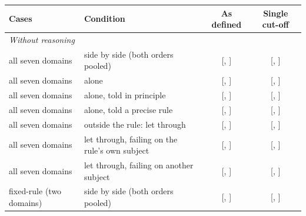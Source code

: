 \begin{table}[t]
\centering
\footnotesize
\begin{tabular}{llcc}
\toprule
Cases & Condition & As defined & Single cut-off \\
\midrule
\multicolumn{4}{l}{\textit{Without reasoning}} \\
all seven domains & side by side (both orders pooled) & \SideBySideNoReasoning{} [\SideBySideNoReasoningLo{}, \SideBySideNoReasoningHi{}] & \CutoffHalfSideBySideNoReasoning{} [\CutoffHalfSideBySideNoReasoningLo{}, \CutoffHalfSideBySideNoReasoningHi{}] \\
all seven domains & alone & \AloneNoReasoning{} [\AloneNoReasoningLo{}, \AloneNoReasoningHi{}] & \CutoffHalfAloneNoReasoning{} [\CutoffHalfAloneNoReasoningLo{}, \CutoffHalfAloneNoReasoningHi{}] \\
all seven domains & alone, told in principle & \ToldPrincipleNoReasoning{} [\ToldPrincipleNoReasoningLo{}, \ToldPrincipleNoReasoningHi{}] & \CutoffHalfToldPrincipleNoReasoning{} [\CutoffHalfToldPrincipleNoReasoningLo{}, \CutoffHalfToldPrincipleNoReasoningHi{}] \\
all seven domains & alone, told a precise rule & \ToldRuleNoReasoning{} [\ToldRuleNoReasoningLo{}, \ToldRuleNoReasoningHi{}] & \CutoffHalfToldRuleNoReasoning{} [\CutoffHalfToldRuleNoReasoningLo{}, \CutoffHalfToldRuleNoReasoningHi{}] \\
all seven domains & outside the rule: let through & \LetThroughNoReasoning{} [\LetThroughNoReasoningLo{}, \LetThroughNoReasoningHi{}] & \CutoffHalfLetThroughNoReasoning{} [\CutoffHalfLetThroughNoReasoningLo{}, \CutoffHalfLetThroughNoReasoningHi{}] \\
all seven domains & let through, failing on the rule's own subject & \LetThroughSameSubjectNoReasoning{} [\LetThroughSameSubjectNoReasoningLo{}, \LetThroughSameSubjectNoReasoningHi{}] & \CutoffHalfLetThroughSameSubjectNoReasoning{} [\CutoffHalfLetThroughSameSubjectNoReasoningLo{}, \CutoffHalfLetThroughSameSubjectNoReasoningHi{}] \\
all seven domains & let through, failing on another subject & \LetThroughOtherSubjectNoReasoning{} [\LetThroughOtherSubjectNoReasoningLo{}, \LetThroughOtherSubjectNoReasoningHi{}] & \CutoffHalfLetThroughOtherSubjectNoReasoning{} [\CutoffHalfLetThroughOtherSubjectNoReasoningLo{}, \CutoffHalfLetThroughOtherSubjectNoReasoningHi{}] \\
fixed-rule (two domains) & side by side (both orders pooled) & \SideBySideNoReasoningFixedRule{} [\SideBySideNoReasoningFixedRuleLo{}, \SideBySideNoReasoningFixedRuleHi{}] & \CutoffHalfSideBySideNoReasoningFixedRule{} [\CutoffHalfSideBySideNoReasoningFixedRuleLo{}, \CutoffHalfSideBySideNoReasoningFixedRuleHi{}] \\

\end{tabular}
\end{table}
